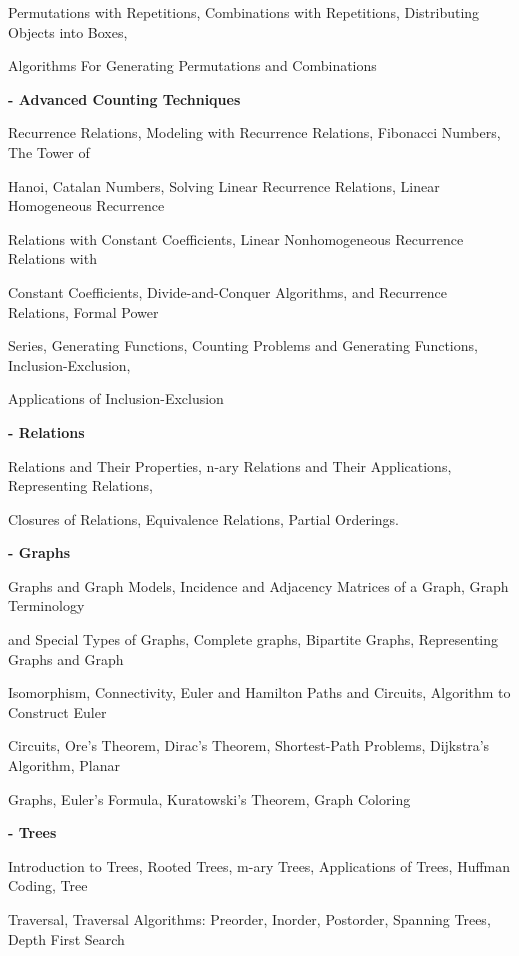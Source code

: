 \documentclass[12pt,a4paper]{article}
\begin{document}
Permutations with Repetitions, Combinations with Repetitions, Distributing Objects into Boxes,\par
Algorithms For Generating Permutations and Combinations\par
\vspace{2pt}\textbf{- Advanced Counting Techniques}\par
Recurrence Relations, Modeling with Recurrence Relations, Fibonacci Numbers, The Tower of\par
Hanoi, Catalan Numbers, Solving Linear Recurrence Relations, Linear Homogeneous Recurrence\par
Relations with Constant Coefficients, Linear Nonhomogeneous Recurrence Relations with\par
Constant Coefficients, Divide-and-Conquer Algorithms, and Recurrence Relations, Formal Power\par
Series, Generating Functions, Counting Problems and Generating Functions, Inclusion-Exclusion,\par
Applications of Inclusion-Exclusion\par
\vspace{2pt}\textbf{- Relations}\par
Relations and Their Properties, n-ary Relations and Their Applications, Representing Relations,\par
Closures of Relations, Equivalence Relations, Partial Orderings.\par
\vspace{2pt}\textbf{- Graphs}\par
Graphs and Graph Models, Incidence and Adjacency Matrices of a Graph, Graph Terminology\par
and Special Types of Graphs, Complete graphs, Bipartite Graphs, Representing Graphs and Graph\par
Isomorphism, Connectivity, Euler and Hamilton Paths and Circuits, Algorithm to Construct Euler\par
Circuits, Ore’s Theorem, Dirac’s Theorem, Shortest-Path Problems, Dijkstra’s Algorithm, Planar\par
Graphs, Euler’s Formula, Kuratowski’s Theorem, Graph Coloring\par
\vspace{2pt}\textbf{- Trees}\par
Introduction to Trees, Rooted Trees, m-ary Trees, Applications of Trees, Huffman Coding, Tree\par
Traversal, Traversal Algorithms: Preorder, Inorder, Postorder, Spanning Trees, Depth First Search\par
\end{document}
